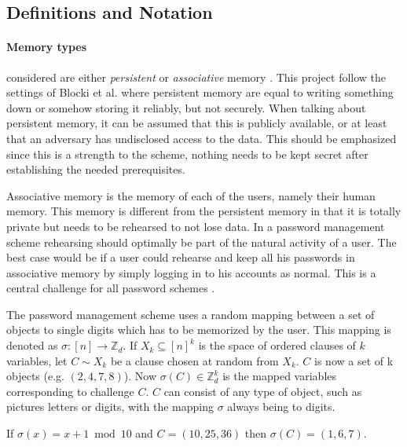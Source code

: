 \subsection{Definitions and Notation}
\paragraph{Memory types} considered are either \emph{persistent} or \emph{associative} memory \cite{human-memory}. This project follow the settings of Blocki et al. \cite{naturally-rehearsing, hcp-blocki} where persistent memory are equal to writing something down or somehow storing it reliably, but not securely. When talking about persistent memory, it can be assumed that this is publicly available, or at least that an adversary has undisclosed access to the data. This should be emphasized since this is a strength to the scheme, nothing needs to be kept secret after establishing the needed prerequisites. 
    \par Associative memory is the memory of each of the users, namely their human memory. This memory is different from the persistent memory in that it is totally private but needs to be rehearsed to not lose data. In a password management scheme rehearsing should optimally be part of the natural activity of a user. The best case would be if a user could rehearse and keep all his passwords in associative memory by simply logging in to his accounts as normal. This is a central challenge for all password schemes \cite{naturally-rehearsing}.

The password management scheme uses a random mapping between a set of objects to single digits which has to be memorized by the user. This mapping is denoted as $\sigma : [n] \rightarrow \mathbb{Z}_d$. If $X_k \subseteq [n]^k$ is the space of ordered clauses of $k$ variables, let $C\sim X_k$ be a clause chosen at random from $X_k$. $C$ is now a set of k objects (e.g. $(2,4,7,8)$). Now $\sigma (C) \in \mathbb{Z}_d^k$ is the mapped variables corresponding to challenge $C$. $C$ can consist of any type of object, such as pictures letters or digits, with the mapping $\sigma$ always being to digits.

\begin{example}
    If $\sigma(x) = x+1  \bmod 10$ and $C = (10,25,36)$ then $\sigma(C) = (1,6,7)$.
\end{example}

